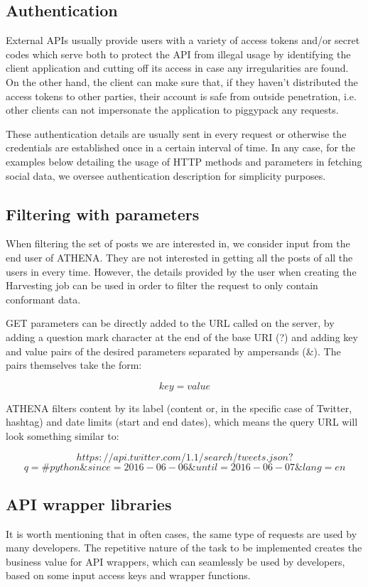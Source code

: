 \subsection{Authentication}
External APIs usually provide users with a variety of access tokens and/or secret codes which serve both to protect the API from illegal usage by identifying the client application and cutting off its access in case any irregularities are found. On the other hand, the client can make sure that, if they haven't distributed the access tokens to other parties, their account is safe from outside penetration, i.e. other clients can not impersonate the application to piggypack any requests.

These authentication details are usually sent in every request or otherwise the credentials are established once in a certain interval of time. In any case, for the examples below detailing the usage of HTTP methods and parameters in fetching social data, we oversee authentication description for simplicity purposes.

\subsection{Filtering with parameters}
When filtering the set of posts we are interested in, we consider input from the end user of ATHENA. They are not interested in getting all the posts of all the users in every time. However, the details provided by the user when creating the Harvesting job can be used in order to filter the request to only contain conformant data.

GET parameters can be directly added to the URL called on the server, by adding a question mark character at the end of the base URI (?) and adding key and value pairs of the desired parameters separated by ampersands (\&). The pairs themselves take the form:

\[key=value\]

ATHENA filters content by its label (content or, in the specific case of Twitter, hashtag) and date limits (start and end dates), which means the query URL will look something similar to:

\[https://api.twitter.com/1.1/search/tweets.json?\]
\[q=\#python\&since=2016-06-06\&until=2016-06-07\&lang=en\]

\subsection{API wrapper libraries}
It is worth mentioning that in often cases, the same type of requests are used by many developers. The repetitive nature of the task to be implemented creates the business value for API wrappers, which can seamlessly be used by developers, based on some input access keys and wrapper functions.

